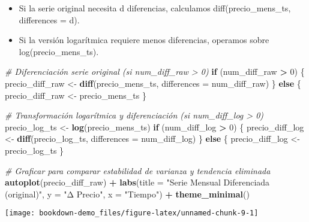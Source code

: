 \documentclass[
  11pt,
]{book}
\newenvironment{Shaded}{\begin{snugshade}}{\end{snugshade}}
\newcommand{\AttributeTok}[1]{\textcolor[rgb]{0.13,0.29,0.53}{#1}}
\newcommand{\CommentTok}[1]{\textcolor[rgb]{0.56,0.35,0.01}{\textit{#1}}}
\newcommand{\ControlFlowTok}[1]{\textcolor[rgb]{0.13,0.29,0.53}{\textbf{#1}}}
\newcommand{\DecValTok}[1]{\textcolor[rgb]{0.00,0.00,0.81}{#1}}
\newcommand{\FunctionTok}[1]{\textcolor[rgb]{0.13,0.29,0.53}{\textbf{#1}}}
\newcommand{\NormalTok}[1]{#1}
\newcommand{\OtherTok}[1]{\textcolor[rgb]{0.56,0.35,0.01}{#1}}
\newcommand{\SpecialCharTok}[1]{\textcolor[rgb]{0.81,0.36,0.00}{\textbf{#1}}}
\newcommand{\StringTok}[1]{\textcolor[rgb]{0.31,0.60,0.02}{#1}}
\begin{document}
\begin{itemize}
\item
  Si la serie original necesita d diferencias, calculamos diff(precio\_mens\_ts, differences = d).
\item
  Si la versión logarítmica requiere menos diferencias, operamos sobre log(precio\_mens\_ts).
\end{itemize}

\begin{Shaded}
\begin{Highlighting}[]
\CommentTok{\# Diferenciación serie original (si num\_diff\_raw \textgreater{} 0)}
\ControlFlowTok{if}\NormalTok{ (num\_diff\_raw }\SpecialCharTok{\textgreater{}} \DecValTok{0}\NormalTok{) \{}
\NormalTok{  precio\_diff\_raw }\OtherTok{\textless{}{-}} \FunctionTok{diff}\NormalTok{(precio\_mens\_ts, }\AttributeTok{differences =}\NormalTok{ num\_diff\_raw)}
\NormalTok{\} }\ControlFlowTok{else}\NormalTok{ \{}
\NormalTok{  precio\_diff\_raw }\OtherTok{\textless{}{-}}\NormalTok{ precio\_mens\_ts}
\NormalTok{\}}

\CommentTok{\# Transformación logarítmica y diferenciación (si num\_diff\_log \textgreater{} 0)}
\NormalTok{precio\_log\_ts }\OtherTok{\textless{}{-}} \FunctionTok{log}\NormalTok{(precio\_mens\_ts)}
\ControlFlowTok{if}\NormalTok{ (num\_diff\_log }\SpecialCharTok{\textgreater{}} \DecValTok{0}\NormalTok{) \{}
\NormalTok{  precio\_diff\_log }\OtherTok{\textless{}{-}} \FunctionTok{diff}\NormalTok{(precio\_log\_ts, }\AttributeTok{differences =}\NormalTok{ num\_diff\_log)}
\NormalTok{\} }\ControlFlowTok{else}\NormalTok{ \{}
\NormalTok{  precio\_diff\_log }\OtherTok{\textless{}{-}}\NormalTok{ precio\_log\_ts}
\NormalTok{\}}

\CommentTok{\# Graficar para comparar estabilidad de varianza y tendencia eliminada}
\FunctionTok{autoplot}\NormalTok{(precio\_diff\_raw) }\SpecialCharTok{+}
  \FunctionTok{labs}\NormalTok{(}\AttributeTok{title =} \StringTok{"Serie Mensual Diferenciada (original)"}\NormalTok{,}
       \AttributeTok{y =} \StringTok{"Δ Precio"}\NormalTok{, }\AttributeTok{x =} \StringTok{"Tiempo"}\NormalTok{) }\SpecialCharTok{+}
  \FunctionTok{theme\_minimal}\NormalTok{()}
\end{Highlighting}
\end{Shaded}

\begin{center}\texttt{[image: bookdown-demo\_files/figure-latex/unnamed-chunk-9-1]} \end{center}
\end{document}
